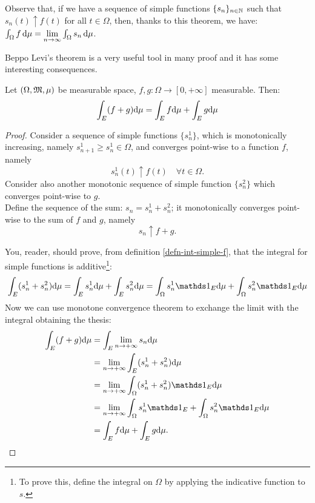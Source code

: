 Observe that, if we have a sequence of simple functions $\{s_n\}_{n\in\mathbb N}$ such that $s_n(t) \uparrow f(t)$ for all $t \in \Omega$, then, thanks to this theorem, we have: $\int_{\Omega}f \, \mathrm d\mu = \lim\limits_{n\to \infty}\int_\Omega s_n\, \mathrm d\mu$.

Beppo Levi's theorem is a very useful tool in many proof and it has some interesting consequences.
\begin{prop}
	Let $(\Omega, \mathfrak M, \mu)$ be measurable space, $f,g:\Omega \to \left[0,+\infty\right]$ measurable. Then:
	$$\int_{E}(f+g)\mathrm d\mu=\int_{E}f \mathrm d\mu + \int_{E}g\mathrm d\mu$$
\end{prop}

\begin{proof}
	Consider a sequence of simple functions $\{s_n^1\}$, which is monotonically increasing, namely $s_{n+1}^1 \geq s_n^1 \in \Omega$, and converges point-wise to a function $f$, namely 
	$$
		s_n^1(t)
		\uparrow f(t) 
		\quad \forall t \in \Omega
	.
	$$
	Consider also another monotonic sequence of simple function $\{s_n^2\}$ which converges point-wise to $g$.\\
	Define the sequence of the sum: $s_n =s_n^1+s_n^2$; it monotonically converges point-wise to the sum of $f$ and $g$, namely 
	$$
		s_n 
		\uparrow f+g
	.
	$$
	
	You, reader, should prove, from definition \vref{defn-int-simple-f}, that the integral for simple functions is additive\footnote{To prove this, define the integral on $\Omega$ by applying the indicative function to $s$.}:
	$$\int_{E}(s_n^1+s_n^2)\de\mu
	= \int_E s_n^1 \de\mu+ \int_E s_n^2 \de\mu
	= \int_\Omega s_n^1\Ind_E \de\mu+ \int_\Omega s_n^2\Ind_E \de\mu$$
	Now we can use monotone convergence theorem to exchange the limit with the integral obtaining the thesis:
	\begin{align*}
		\int_E (f+g) \de\mu
		&= \int_E \lim_{n \to +\infty}s_n \de\mu\\
		&= \lim_{n\to +\infty} \int_E (s_n^1 + s_n^2) \de\mu\\
		&= \lim_{n\to +\infty} \int_\Omega (s_n^1 + s_n^2)\Ind_E \de\mu\\
		&= \lim_{n\to +\infty} \int_\Omega s_n^1\Ind_E + \int_\Omega s_n^2\Ind_E \de\mu\\
		&= \int_E f \de\mu +\int_E g \de\mu.
	\end{align*}
\end{proof}


